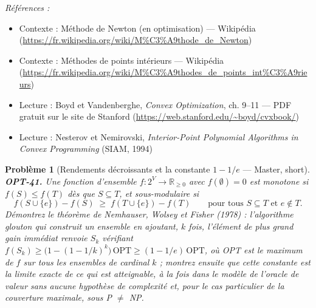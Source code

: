 \documentclass[11pt]{article}
\newtheorem{problem}{Problème}
\newenvironment{refs}{\par\small\noindent\emph{Références :}\begin{itemize}\setlength\itemsep{0pt}}{\end{itemize}\normalsize}
\begin{document}
\begin{refs}
\item Contexte : Méthode de Newton (en optimisation) --- Wikipédia (\url{https://fr.wikipedia.org/wiki/M%C3%A9thode_de_Newton})
\item Contexte : Méthodes de points intérieurs --- Wikipédia (\url{https://fr.wikipedia.org/wiki/M%C3%A9thodes_de_points_int%C3%A9rieurs})
\item Lecture : Boyd et Vandenberghe, \textit{Convex Optimization}, ch. 9--11 --- PDF gratuit sur le site de Stanford (\url{https://web.stanford.edu/~boyd/cvxbook/})
\item Lecture : Nesterov et Nemirovski, \textit{Interior-Point Polynomial Algorithms in Convex Programming} (SIAM, 1994)
\end{refs}

\bigskip

\begin{problem}[{Rendements décroissants et la constante $1 - 1/e$ --- Master, short}]
\textbf{OPT-41.} Une fonction d'ensemble $f : 2^V \to \mathbb{R}_{\ge 0}$ avec $f(\emptyset) = 0$ est \textit{monotone} si $f(S) \le f(T)$ dès que $S \subseteq T$, et \textit{sous-modulaire} si
\[ f(S \cup \{e\}) - f(S) \;\ge\; f(T \cup \{e\}) - f(T) \qquad \text{pour tous } S \subseteq T \text{ et } e \notin T . \]
Démontrez le théorème de Nemhauser, Wolsey et Fisher (1978) : l'algorithme glouton qui construit un ensemble en ajoutant, $k$ fois, l'élément de plus grand gain immédiat renvoie $S_k$ vérifiant $f(S_k) \ge \big(1 - (1 - 1/k)^k\big)\,\mathrm{OPT} \ge (1 - 1/e)\,\mathrm{OPT}$, où OPT est le maximum de $f$ sur tous les ensembles de cardinal $k$ ; montrez ensuite que cette constante est la limite exacte de ce qui est atteignable, à la fois dans le modèle de l'oracle de valeur sans aucune hypothèse de complexité et, pour le cas particulier de la couverture maximale, sous P $\ne$ NP.
\end{problem}
\end{document}
